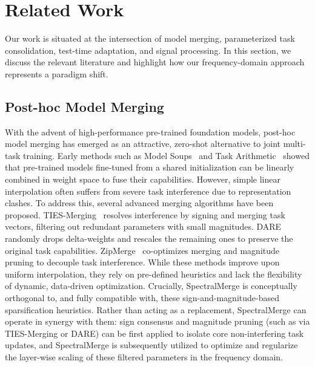\section{Related Work}
\label{sec:related_work}

Our work is situated at the intersection of model merging, parameterized task consolidation, test-time adaptation, and signal processing. In this section, we discuss the relevant literature and highlight how our frequency-domain approach represents a paradigm shift.

\subsection{Post-hoc Model Merging}
With the advent of high-performance pre-trained foundation models, post-hoc model merging has emerged as an attractive, zero-shot alternative to joint multi-task training. Early methods such as Model Soups~\cite{wortsman2022model} and Task Arithmetic~\cite{ilharco2022editing} showed that pre-trained models fine-tuned from a shared initialization can be linearly combined in weight space to fuse their capabilities. However, simple linear interpolation often suffers from severe task interference due to representation clashes. To address this, several advanced merging algorithms have been proposed. TIES-Merging~\cite{yadav2023ties} resolves interference by signing and merging task vectors, filtering out redundant parameters with small magnitudes. DARE~\cite{dare2023} randomly drops delta-weights and rescales the remaining ones to preserve the original task capabilities. ZipMerge~\cite{zipmerge} co-optimizes merging and magnitude pruning to decouple task interference. While these methods improve upon uniform interpolation, they rely on pre-defined heuristics and lack the flexibility of dynamic, data-driven optimization. Crucially, SpectralMerge is conceptually orthogonal to, and fully compatible with, these sign-and-magnitude-based sparsification heuristics. Rather than acting as a replacement, SpectralMerge can operate in synergy with them: sign consensus and magnitude pruning (such as via TIES-Merging or DARE) can be first applied to isolate core non-interfering task updates, and SpectralMerge is subsequently utilized to optimize and regularize the layer-wise scaling of these filtered parameters in the frequency domain.

